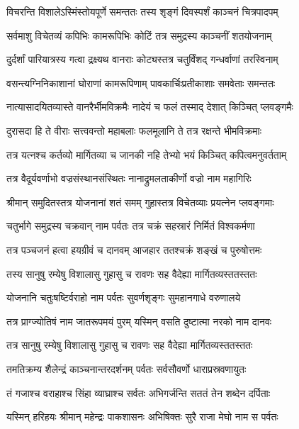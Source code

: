 \twolineshloka
{विचरन्ति विशालेऽस्मिंस्तोयपूर्णे समन्ततः}
{तस्य शृङ्गं दिवस्पर्शं काञ्चनं चित्रपादपम्} %

\twolineshloka
{सर्वमाशु विचेतव्यं कपिभिः कामरूपिभिः}
{कोटिं तत्र समुद्रस्य काञ्चनीं शतयोजनाम्} %

\twolineshloka
{दुर्दर्शां पारियात्रस्य गत्वा द्रक्ष्यथ वानराः}
{कोट्यस्तत्र चतुर्विंशद् गन्धर्वाणां तरस्विनाम्} %

\twolineshloka
{वसन्त्यग्निनिकाशानां घोराणां कामरूपिणाम्}
{पावकार्चिःप्रतीकाशाः समवेताः समन्ततः} %

\twolineshloka
{नात्यासादयितव्यास्ते वानरैर्भीमविक्रमैः}
{नादेयं च फलं तस्माद् देशात् किञ्चित् प्लवङ्गमैः} %

\twolineshloka
{दुरासदा हि ते वीराः सत्त्ववन्तो महाबलाः}
{फलमूलानि ते तत्र रक्षन्ते भीमविक्रमाः} %

\twolineshloka
{तत्र यत्नश्च कर्तव्यो मार्गितव्या च जानकी}
{नहि तेभ्यो भयं किञ्चित् कपित्वमनुवर्तताम्} %

\twolineshloka
{तत्र वैदूर्यवर्णाभो वज्रसंस्थानसंस्थितः}
{नानाद्रुमलताकीर्णो वज्रो नाम महागिरिः} %

\twolineshloka
{श्रीमान् समुदितस्तत्र योजनानां शतं समम्}
{गुहास्तत्र विचेतव्याः प्रयत्नेन प्लवङ्गमाः} %

\twolineshloka
{चतुर्भागे समुद्रस्य चक्रवान् नाम पर्वतः}
{तत्र चक्रं सहस्रारं निर्मितं विश्वकर्मणा} %

\twolineshloka
{तत्र पञ्चजनं हत्वा हयग्रीवं च दानवम्}
{आजहार ततश्चक्रं शङ्खं च पुरुषोत्तमः} %

\twolineshloka
{तस्य सानुषु रम्येषु विशालासु गुहासु च}
{रावणः सह वैदेह्या मार्गितव्यस्ततस्ततः} %

\twolineshloka
{योजनानि चतुःषष्टिर्वराहो नाम पर्वतः}
{सुवर्णशृङ्गः सुमहानगाधे वरुणालये} %

\twolineshloka
{तत्र प्राग्ज्योतिषं नाम जातरूपमयं पुरम्}
{यस्मिन् वसति दुष्टात्मा नरको नाम दानवः} %

\twolineshloka
{तत्र सानुषु रम्येषु विशालासु गुहासु च}
{रावणः सह वैदेह्या मार्गितव्यस्ततस्ततः} %

\twolineshloka
{तमतिक्रम्य शैलेन्द्रं काञ्चनान्तरदर्शनम्}
{पर्वतः सर्वसौवर्णो धाराप्रस्रवणायुतः} %

\twolineshloka
{तं गजाश्च वराहाश्च सिंहा व्याघ्राश्च सर्वतः}
{अभिगर्जन्ति सततं तेन शब्देन दर्पिताः} %

\twolineshloka
{यस्मिन् हरिहयः श्रीमान् महेन्द्रः पाकशासनः}
{अभिषिक्तः सुरै राजा मेघो नाम स पर्वतः} %

